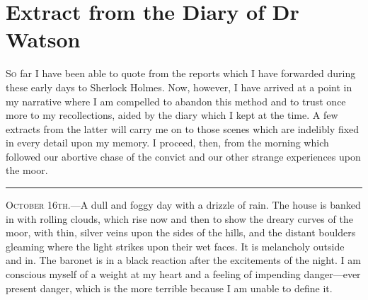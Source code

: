 \chapter{Extract from the Diary of Dr Watson}
\lettrine[lines=4]{S}{o} far I have been able to quote from the reports which I have forwarded during these early days to Sherlock Holmes. Now, however, I have arrived at a point in my narrative where I am compelled to abandon this method and to trust once more to my recollections, aided by the diary which I kept at the time. A few extracts from the latter will carry me on to those scenes which are indelibly fixed in every detail upon my memory. I proceed, then, from the morning which followed our abortive chase of the convict and our other strange experiences upon the moor.
\vfill

\noindent\hfil\rule{0.5\textwidth}{.4pt}\hfil 

\textsc{October 16th.}—A dull and foggy day with a drizzle of rain. The house is banked in with rolling clouds, which rise now and then to show the dreary curves of the moor, with thin, silver veins upon the sides of the hills, and the distant boulders gleaming where the light strikes upon their wet faces. It is melancholy outside and in. The baronet is in a black reaction after the excitements of the night. I am conscious myself of a weight at my heart and a feeling of impending danger—ever present danger, which is the more terrible because I am unable to define it.

